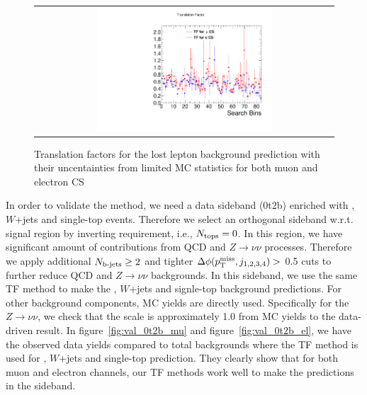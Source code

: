 \begin{figure}[htbp]
  \begin{center}
  \begin{tabular}{c}
  \includegraphics[angle=0,width=0.60\textwidth]{sections/mc4/Backgrounds/TF/figures/comp_TF_lostle_comb.pdf}
  \end{tabular}
  \caption{Translation factors for the lost lepton background prediction with their uncentainties from limited MC statistics for both muon and electron CS}
    \label{fig:lostle_TF}
  \end{center}
\end{figure}

In order to validate the method, we need a data sideband (0t2b) enriched with \ttbar, $W$+jets and single-top events. Therefore we select an orthogonal sideband w.r.t. signal region by inverting \ntops requirement, i.e., $N_{\text{tops}}=0$. In this region, we have significant amount of contributions from QCD and $Z \rightarrow \nu \nu$ processes. Therefore we apply additional $N_{\text{b-jets}}\geq2$ and tighter $\Delta\phi(p^{\rm miss}_{\rm T}, j_{1,2,3,4})>$ 0.5 cuts to further reduce QCD and $Z \rightarrow \nu \nu$ backgrounds. In this sideband, we use the same TF method to make the \ttbar, $W$+jets and signle-top background predictions. For other background components, MC yields are directly used. Specifically for the $Z \rightarrow \nu \nu$, we check that the scale is approximately 1.0 from MC yields to the data-driven result. In figure~\ref{fig:val_0t2b_mu} and figure~\ref{fig:val_0t2b_el}, we have the observed data yields compared to total backgrounds where the TF method is used for \ttbar, $W$+jets and single-top prediction. They clearly show that for both muon and electron channels, our TF methods work well to make the predictions in the sideband.

